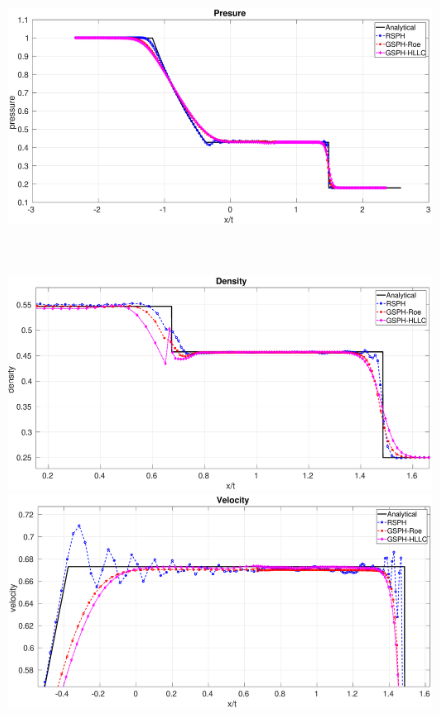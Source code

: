 \documentclass[review]{elsarticle}
\begin{document}
\begin{figure}[htp]
\begin{minipage}{.495\textwidth}
    \end{minipage}%
    \begin{minipage}{.495 \textwidth}
        \centering
        \includegraphics[width=0.99 \textwidth,height=0.6\textwidth]{./Figures/Sod/RCM-Sod-GSPH-compare-p}
    \end{minipage}%
    \\
    \begin{minipage}{.495\textwidth}
        \centering
        \includegraphics[width=0.99 \textwidth,height=0.6\textwidth]{./Figures/Sod/RCM-Sod-GSPH-compare-rho-zoom}
    \end{minipage}%
    \begin{minipage}{.495 \textwidth}
        \centering
        \includegraphics[width=0.99 \textwidth,height=0.6\textwidth]{./Figures/Sod/RCM-Sod-GSPH-compare-v-zoom}

\end{minipage}
\end{figure}
\end{document}
